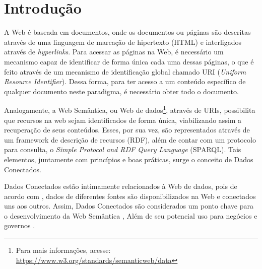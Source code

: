 \chapter{Introdução}
\label{cap:introducao}
A Web é baseada em documentos, onde os documentos ou páginas são descritas através de uma linguagem de marcação de hipertexto (HTML) e interligados através de \textit{hyperlinks}. Para acessar as páginas na Web, é necessário um mecanismo capaz de identificar de forma única cada uma dessas páginas, o que é feito através de um mecanismo de identificação global chamado URI (\textit{Uniform Resource Identifier}). Dessa forma, para ter acesso a um conteúdo específico de qualquer documento neste paradigma, é necessário obter todo o documento.

Analogamente, a Web Semântica, ou Web de dados\footnote{Para mais informações, acesse: \url{https://www.w3.org/standards/semanticweb/data}}, através de URIs, possibilita que recursos na web sejam identificados de forma única, viabilizando assim a recuperação de seus conteúdos. Esses, por sua vez, são representados através de um framework de descrição de recursos (RDF), além de contar com um protocolo para consulta, o \textit{Simple Protocol and RDF Query Language} (SPARQL). Tais elementos, juntamente com princípios e boas práticas, surge o conceito de Dados Conectados.

 
Dados Conectados estão intimamente relacionados à Web de dados, pois de acordo com , dados de diferentes fontes são disponibilizados na Web e conectados uns aos outros. Assim, Dados Conectados são considerados um ponto chave para o desenvolvimento da Web Semântica \cite{berners2001semantic}, Além de seu potencial uso para negócios e governos \cite{Isotani2015}.  

